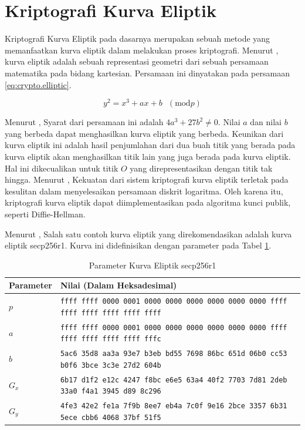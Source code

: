 \section{Kriptografi Kurva Eliptik}
Kriptografi Kurva Eliptik pada dasarnya merupakan sebuah metode yang memanfaatkan kurva eliptik dalam melakukan proses kriptografi. Menurut \textcite{betaccini2022}, kurva eliptik adalah sebuah representasi geometri dari sebuah persamaan matematika pada bidang kartesian. Persamaan ini dinyatakan pada persamaan \ref{eq:crypto.elliptic}.

\begin{equation}
  \label{eq:crypto.elliptic}
  y^2 = x^3 + ax + b\text{ }(\text{mod} p)
\end{equation}

Menurut \textcite{munir2019}, Syarat dari persamaan ini adalah $4a^3 + 27b^2 \neq 0$. Nilai $a$ dan nilai $b$ yang berbeda dapat menghasilkan kurva eliptik yang berbeda. Keunikan dari kurva eliptik ini adalah hasil penjumlahan dari dua buah titik yang berada pada kurva eliptik akan menghasilkan titik lain yang juga berada pada kurva eliptik. Hal ini dikecualikan untuk titik $O$ yang direpresentasikan dengan titik tak hingga. Menurut \textcite{betaccini2022}, Kekuatan dari sistem kriptografi kurva eliptik terletak pada kesulitan dalam menyelesaikan persamaan diskrit logaritma. Oleh karena itu, kriptografi kurva eliptik dapat diimplementasikan pada algoritma kunci publik, seperti Diffie-Hellman.

Menurut \textcite{certicom2000}, Salah satu contoh kurva eliptik yang direkomendasikan adalah kurva eliptik secp256r1. Kurva ini didefinisikan dengan parameter pada Tabel \ref{tab:crypto.secp256r1}.

\begin{table}[!h]
  \centering
  \caption{Parameter Kurva Eliptik secp256r1}
  \label{tab:crypto.secp256r1}
  \begin{tabular}{|p{1in}|p{4in}|}
    \hline
    \textbf{Parameter} & \textbf{Nilai (Dalam Heksadesimal)} \\
    \hline
    $p$ & \texttt{ffff ffff 0000 0001 0000 0000 0000 0000 0000 0000 ffff ffff ffff ffff ffff ffff} \\ \hline
    $a$ & \texttt{ffff ffff 0000 0001 0000 0000 0000 0000 0000 0000 ffff ffff ffff ffff ffff fffc} \\ \hline
    $b$ & \texttt{5ac6 35d8 aa3a 93e7 b3eb bd55 7698 86bc 651d 06b0 cc53 b0f6 3bce 3c3e 27d2 604b} \\ \hline
    $G_x$ & \texttt{6b17 d1f2 e12c 4247 f8bc e6e5 63a4 40f2 7703 7d81 2deb 33a0 f4a1 3945 d89 8c296} \\ \hline 
    $G_y$ & \texttt{4fe3 42e2 fe1a 7f9b 8ee7 eb4a 7c0f 9e16 2bce 3357 6b31 5ece cbb6 4068 37bf 51f5} \\ \hline
  \end{tabular}
\end{table}

